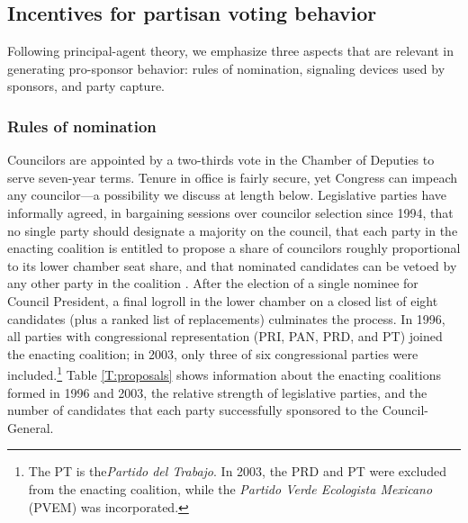 \documentclass[12 pt, letter]{article}
\begin{document}
\subsection{Incentives for partisan voting behavior}
Following principal-agent theory, we emphasize three aspects that
are relevant in generating pro-sponsor behavior: rules of
nomination, signaling devices used by sponsors, and party capture.

\subsubsection{Rules of nomination}
Councilors are appointed by a two-thirds vote in the Chamber of
Deputies to serve seven-year terms.  Tenure in office is fairly
secure, yet Congress can impeach any councilor---a possibility we
discuss at length below.  Legislative parties have informally
agreed, in bargaining sessions over councilor selection since 1994,
that no single party should designate a majority on the council,
that each party in the enacting coalition is entitled to propose a
share of councilors roughly proportional to its lower chamber seat
share, and that nominated candidates can be vetoed by any other
party in the coalition \citep{Alcocer1995, Schedler2000a}. After the
election of a single nominee for Council President, a final logroll
in the lower chamber on a closed list of eight candidates (plus a
ranked list of replacements) culminates the process.  In 1996, all
parties with congressional representation (PRI, PAN, PRD, and PT)
joined the enacting coalition; in 2003, only three of six
congressional parties were included.\footnote{The PT is
the\emph{Partido del Trabajo}.  In 2003, the PRD and PT were
excluded from the enacting coalition, while the \emph{Partido Verde
Ecologista Mexicano} (PVEM) was incorporated.}  Table
\ref{T:proposals} shows information about the enacting coalitions
formed in 1996 and 2003, the relative strength of legislative
parties, and the number of candidates that each party successfully
sponsored to the Council-General.
\end{document}
